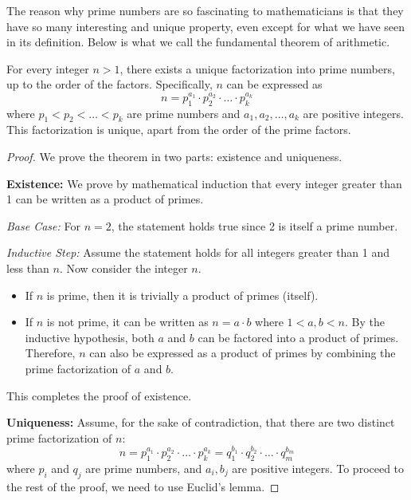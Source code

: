         The reason why prime numbers are so fascinating to mathematicians is that they have so many
        interesting and unique property, even except for what we have seen in its definition. Below is what we call the fundamental theorem of arithmetic.
        \begin{theorem}
            For every integer $n > 1$, there exists a unique factorization into prime numbers, up to the order of the factors. Specifically, $n$ can be expressed as
            \[ n = p_1^{a_1} \cdot p_2^{a_2} \cdot \ldots \cdot p_k^{a_k} \]
            where $p_1 < p_2 < \ldots < p_k$ are prime numbers and $a_1, a_2, \ldots, a_k$ are positive integers. This factorization is unique, apart from the order of the prime factors.
        \end{theorem}
        \begin{proof}
            We prove the theorem in two parts: existence and uniqueness.
            
            \textbf{Existence:} We prove by mathematical induction that every integer greater than 1 can be written as a product of primes.
            
            \textit{Base Case:} For $n = 2$, the statement holds true since 2 is itself a prime number.
            
            \textit{Inductive Step:} Assume the statement holds for all integers greater than 1 and less than $n$. Now consider the integer $n$.
            \begin{itemize}
                \item If $n$ is prime, then it is trivially a product of primes (itself).
                \item If $n$ is not prime, it can be written as $n = a \cdot b$ where $1 < a, b < n$. By the inductive hypothesis, both $a$ and $b$ can be factored into a product of primes. Therefore, $n$ can also be expressed as a product of primes by combining the prime factorization of $a$ and $b$.
            \end{itemize}
            This completes the proof of existence.
            
            \textbf{Uniqueness:} Assume, for the sake of contradiction, that there are two distinct prime factorization of $n$:
            \[ n = p_1^{a_1} \cdot p_2^{a_2} \cdot \ldots \cdot p_k^{a_k} = q_1^{b_1} \cdot q_2^{b_2} \cdot \ldots \cdot q_m^{b_m} \]
            where $p_i$ and $q_j$ are prime numbers, and $a_i, b_j$ are positive integers.
            To proceed to the rest of the proof, we need to use Euclid's lemma.


\end{proof}
